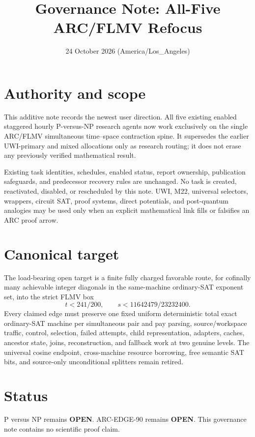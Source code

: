 \documentclass[11pt]{article}
\title{Governance Note: All-Five ARC/FLMV Refocus}
\date{24 October 2026 (America/Los\_Angeles)}
\begin{document}
\maketitle

\section*{Authority and scope}
This additive note records the newest user direction.  All five existing
enabled staggered hourly P-versus-NP research agents now work exclusively on the
single ARC/FLMV simultaneous time--space contraction spine.  It supersedes the
earlier UWI-primary and mixed allocations only as research routing; it does not
erase any previously verified mathematical result.

Existing task identities, schedules, enabled status, report ownership,
publication safeguards, and predecessor recovery rules are unchanged.  No task
is created, reactivated, disabled, or rescheduled by this note.  UWI, M22,
universal selectors, wrappers, circuit SAT, proof systems, direct potentials,
and post-quantum analogies may be used only when an explicit mathematical link
fills or falsifies an ARC proof arrow.

\section*{Canonical target}
The load-bearing open target is a finite fully charged favorable route, for
cofinally many achievable integer diagonals in the same-machine ordinary-SAT
exponent set, into the strict FLMV box
\[
 t<241/200,\qquad s<11642479/23232400.
\]
Every claimed edge must preserve one fixed uniform deterministic total exact
ordinary-SAT machine per simultaneous pair and pay parsing, source/workspace
traffic, control, selection, failed attempts, child representation, adapters,
caches, ancestor state, joins, reconstruction, and fallback work at two genuine
levels.  The universal cosine endpoint, cross-machine resource borrowing, free
semantic SAT bits, and source-only unconditional splitters remain retired.

\section*{Status}
P versus NP remains \textbf{OPEN}.  ARC-EDGE-90 remains \textbf{OPEN}.  This
governance note contains no scientific proof claim.
\end{document}
